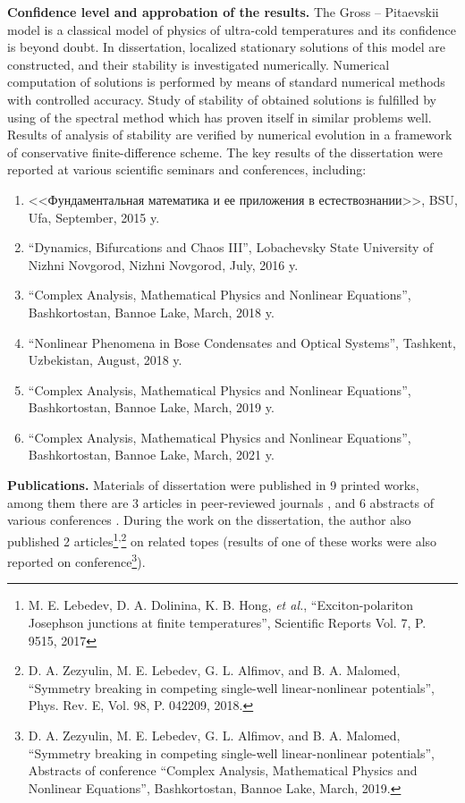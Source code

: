 \documentclass[candidate, href, colorlinks]{disser}
\begin{document}
\textbf{Confidence level and approbation of the results.}
The Gross -- Pitaevskii model is a classical model of physics of ultra-cold temperatures and its confidence is beyond doubt.
In dissertation, localized stationary solutions of this model are constructed, and their stability is investigated numerically.
Numerical computation of solutions is performed by means of standard numerical methods with controlled accuracy.
Study of stability of obtained solutions is fulfilled by using of the spectral method which has proven itself in similar problems well.
Results of analysis of stability are verified by numerical evolution in a framework of conservative finite-difference scheme.
The key results of the dissertation were reported at various scientific seminars and conferences, including:
\begin{enumerate}
	\item <<Фундаментальная математика и ее приложения в естествознании>>, BSU, Ufa, September, 2015 y.
	\item ``Dynamics, Bifurcations and Chaos III'', Lobachevsky State University of Nizhni Novgorod, Nizhni Novgorod, July, 2016 y.
	\item ``Complex Analysis, Mathematical Physics and Nonlinear Equations'', Bashkortostan, Bannoe Lake, March, 2018 y.
	\item ``Nonlinear Phenomena in Bose Condensates and Optical Systems'', Tashkent, Uzbekistan, August, 2018 y.
	\item ``Complex Analysis, Mathematical Physics and Nonlinear Equations'', Bashkortostan, Bannoe Lake, March, 2019 y.
	\item ``Complex Analysis, Mathematical Physics and Nonlinear Equations'', Bashkortostan, Bannoe Lake, March, 2021 y.
\end{enumerate}

\textbf{Publications.}
Materials of dissertation were published in 9 printed works, among them there are 3 articles in peer-reviewed journals \cite{AlfimovLebedev, LebedevAlfimovMalomed, AlfimovGegelLebedevMalomedZezyulin}, and 6 abstracts of various conferences \cite{Ufa2015, NizhniNovgorod2016, Bannoe2018, Tashkent2018, Bannoe2019, Bannoe2021}.
During the work on the dissertation, the author also published 2 articles\footnote{M. E. Lebedev, D. A. Dolinina, K. B. Hong, {\it et al.}, ``Exciton-polariton Josephson junctions at finite temperatures'', Scientific Reports Vol. 7, P. 9515, 2017}\textsuperscript{,}\footnote{D. A. Zezyulin, M. E. Lebedev, G. L. Alfimov, and B. A. Malomed, ``Symmetry breaking in competing single-well linear-nonlinear potentials'', Phys. Rev. E, Vol. 98, P. 042209, 2018.} on related topes (results of one of these works were also reported on conference\footnote{D. A. Zezyulin, M. E. Lebedev, G. L. Alfimov, and B. A. Malomed, ``Symmetry breaking in competing single-well linear-nonlinear potentials'', Abstracts of conference ``Complex Analysis, Mathematical Physics and Nonlinear Equations'', Bashkortostan, Bannoe Lake, March, 2019.}).
\end{document}
